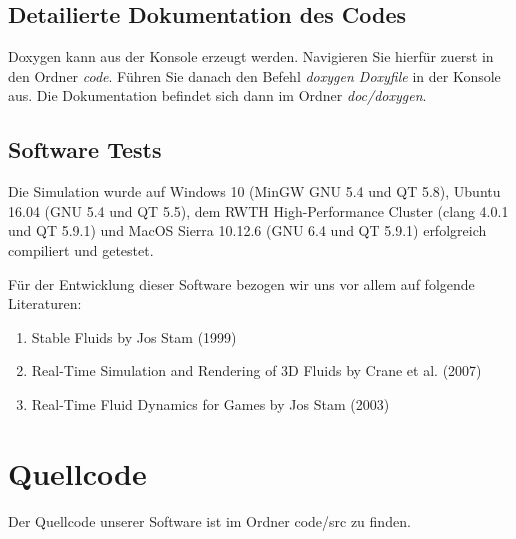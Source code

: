 \documentclass[a4paper,12pt]{scrreprt}
\begin{document}
\section{Detailierte Dokumentation des Codes}
\label{sec:doxygenerzeugung}

Doxygen kann aus der Konsole erzeugt werden. Navigieren Sie hierf\"ur zuerst in den Ordner \textit{code}. F\"uhren Sie danach den Befehl  \textit{doxygen Doxyfile} in der Konsole aus. Die Dokumentation befindet sich dann im Ordner \textit{doc/doxygen}.

\section{Software Tests}

Die Simulation wurde auf Windows 10 (MinGW GNU 5.4 und QT 5.8), Ubuntu 16.04 (GNU 5.4 und QT 5.5), dem RWTH High-Performance Cluster (clang 4.0.1 und QT 5.9.1) und MacOS Sierra 10.12.6 (GNU 6.4 und QT 5.9.1) erfolgreich compiliert und getestet.




\appendix

F\"ur der Entwicklung dieser Software bezogen wir uns vor allem auf folgende Literaturen:

\begin{enumerate}
  \item Stable Fluids by Jos Stam (1999)
  \item Real-Time Simulation and Rendering of 3D Fluids by Crane et al. (2007)
  \item Real-Time Fluid Dynamics for Games by Jos Stam (2003)
\end{enumerate}

\chapter{Quellcode}

Der Quellcode unserer Software ist im Ordner code/src zu finden.
\end{document}
